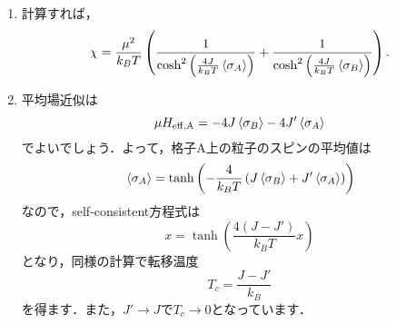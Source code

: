 \documentclass[a4paper,pdflatex,ja=standard]{bxjsarticle}
\begin{document}
\begin{enumerate}
  \item 
  計算すれば，
  \begin{equation}
    \chi
    =
    \frac{\mu^2}{k_BT}
    \left(  
      \dfrac{1}{\cosh^2\left( \frac{4J}{k_BT}\ev*{\sigma_A} \right)}
      +
      \dfrac{1}{\cosh^2\left( \frac{4J}{k_BT}\ev*{\sigma_B} \right)}
    \right)
    .
  \end{equation}

  \item 
  平均場近似は
  \begin{equation}
    \mu H_{\mathrm{eff,A}}
    =
    -4J\ev*{\sigma_B}
    -4J'\ev*{\sigma_A}
  \end{equation}
  でよいでしょう．よって，格子A上の粒子のスピンの平均値は
  \begin{equation}
    \ev*{\sigma_A}
    =
    \tanh
    \left(  
      -\frac{4}{k_BT}
      \left( J\ev*{\sigma_B}+J'\ev*{\sigma_A} \right)
    \right)
  \end{equation}
  なので，self-consistent方程式は
  \begin{equation}
    x
    =
    \tanh\left( \frac{4(J-J')}{k_BT}x \right)
  \end{equation}
  となり，同様の計算で転移温度
  \begin{equation}
    T_c
    =
    \frac{J-J'}{k_B}
  \end{equation}
  を得ます．また，$J'\rightarrow J$で$T_c\rightarrow 0$となっています．

\end{enumerate}
\end{document}
